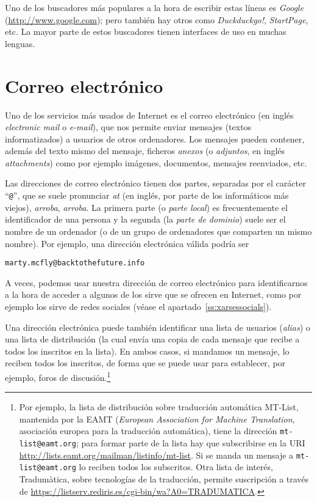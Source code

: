 Uno de los buscadores más populares a la hora de escribir estas líneas es \emph{Google} (\url{http://www.google.com}); pero también hay otros como \emph{Duckduckgo!}, \emph{StartPage}, etc. La mayor parte de estos buscadores tienen interfaces de uso en muchas lenguas. 

\section{Correo electrónico} \label{ss:correue} Uno de los servicios más usados de Internet es el correo electrónico (en inglés \emph{electronic mail} o \emph{e-mail}), que nos permite enviar mensajes (textos informatizados) a usuarios de otros ordenadores. Los mensajes pueden contener, además del texto mismo del mensaje, ficheros \emph{anexos} (o \emph{adjuntos}, en inglés \emph{attachments}) como por ejemplo imágenes, documentos, mensajes reenviados, etc. 

Las direcciones de correo electrónico tienen dos partes, separadas por el carácter ``\texttt{@}'', que se suele pronunciar \emph{at} (en inglés, por parte de los informáticos más viejos), {\em arroba}, \emph{arroba}. La primera parte (o \emph{parte local}) es frecuentemente el identificador de una persona y la segunda (la \emph{parte de dominio}) suele ser el nombre de un ordenador (o de un grupo de ordenadores que comparten un mismo nombre). Por ejemplo, una dirección electrónica válida podría ser \begin{center} \texttt{marty.mcfly@backtothefuture.info} \end{center} A veces, podemos usar nuestra dirección de correo electrónico para identificarnos a la hora de acceder a algunos de los sirve que se ofrecen en Internet, como por ejemplo los sirve de redes sociales (véase el apartado~\ref{ss:xarsessocials}). 

Una dirección electrónica puede también identificar una lista de usuarios (\emph{alias}) o una lista de distribución (la cual envía una copia de cada mensaje que recibe a todos los inscritos en la lista). En ambos casos, si mandamos un mensaje, lo reciben todos los inscritos, de forma que se puede usar para establecer, por ejemplo, foros de discusión.\footnote{Por ejemplo, la lista de distribución sobre traducción automática MT-List, mantenida por la EAMT (\emph{European Association for Machine Translation}, asociación europea para la traducción automática), tiene la dirección \texttt{mt-list@eamt.org}; para formar parte de la lista hay que subscribirse en la URI \url{http://lists.eamt.org/mailman/listinfo/mt-list}. Si se manda un mensaje a \texttt{mt-list@eamt.org} lo reciben todos los subscritos. Otra lista de interés, Tradumàtica, sobre tecnologías de la traducción, permite suscripción a través de \url{https://listserv.rediris.es/cgi-bin/wa?A0=TRADUMATICA}.} 

